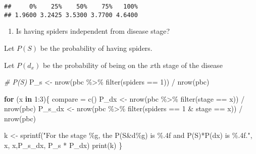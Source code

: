 \documentclass[
]{article}
\newenvironment{Shaded}{\begin{snugshade}}{\end{snugshade}}
\newcommand{\CommentTok}[1]{\textcolor[rgb]{0.56,0.35,0.01}{\textit{#1}}}
\newcommand{\ControlFlowTok}[1]{\textcolor[rgb]{0.13,0.29,0.53}{\textbf{#1}}}
\newcommand{\DecValTok}[1]{\textcolor[rgb]{0.00,0.00,0.81}{#1}}
\newcommand{\FunctionTok}[1]{\textcolor[rgb]{0.00,0.00,0.00}{#1}}
\newcommand{\NormalTok}[1]{#1}
\newcommand{\OtherTok}[1]{\textcolor[rgb]{0.56,0.35,0.01}{#1}}
\newcommand{\SpecialCharTok}[1]{\textcolor[rgb]{0.00,0.00,0.00}{#1}}
\newcommand{\StringTok}[1]{\textcolor[rgb]{0.31,0.60,0.02}{#1}}
\providecommand{\tightlist}{%
  \setlength{\itemsep}{0pt}\setlength{\parskip}{0pt}}
\begin{document}
\begin{Shaded}
\end{Shaded}

\begin{verbatim}
##     0%    25%    50%    75%   100% 
## 1.9600 3.2425 3.5300 3.7700 4.6400
\end{verbatim}

\begin{enumerate}
\def\labelenumi{\alph{enumi})}
\setcounter{enumi}{9}
\tightlist
\item
  Is having spiders independent from disease stage?
\end{enumerate}

Let \(P(S)\) be the probability of having spiders.

Let \(P(d_x)\) be the probability of being on the \(x\)th stage of the
disease

\begin{Shaded}
\begin{Highlighting}[]
\CommentTok{\# P(S)}
\NormalTok{P\_s }\OtherTok{\textless{}{-}} \FunctionTok{nrow}\NormalTok{(pbc }\SpecialCharTok{\%\textgreater{}\%}
       \FunctionTok{filter}\NormalTok{(spiders }\SpecialCharTok{==} \DecValTok{1}\NormalTok{)) }\SpecialCharTok{/} 
  \FunctionTok{nrow}\NormalTok{(pbc)}

\ControlFlowTok{for}\NormalTok{ (x }\ControlFlowTok{in} \DecValTok{1}\SpecialCharTok{:}\DecValTok{3}\NormalTok{)\{}
\NormalTok{  compare }\OtherTok{=} \FunctionTok{c}\NormalTok{()}
\NormalTok{  P\_dx }\OtherTok{\textless{}{-}} \FunctionTok{nrow}\NormalTok{(pbc }\SpecialCharTok{\%\textgreater{}\%}
                 \FunctionTok{filter}\NormalTok{(stage }\SpecialCharTok{==}\NormalTok{ x)) }\SpecialCharTok{/}
    \FunctionTok{nrow}\NormalTok{(pbc)}
\NormalTok{  P\_s\_dx }\OtherTok{\textless{}{-}} \FunctionTok{nrow}\NormalTok{(pbc }\SpecialCharTok{\%\textgreater{}\%}
                   \FunctionTok{filter}\NormalTok{(spiders }\SpecialCharTok{==} \DecValTok{1} \SpecialCharTok{\&} 
\NormalTok{                            stage }\SpecialCharTok{==}\NormalTok{ x)) }\SpecialCharTok{/}
    \FunctionTok{nrow}\NormalTok{(pbc)}
  
\NormalTok{  k }\OtherTok{\textless{}{-}} \FunctionTok{sprintf}\NormalTok{(}\StringTok{"For the stage \%g, the P(S\&d\%g) is \%.4f and P(S)*P(dx) is \%.4f."}\NormalTok{, x, x,P\_s\_dx, P\_s }\SpecialCharTok{*}\NormalTok{ P\_dx)}
  \FunctionTok{print}\NormalTok{(k)}
\NormalTok{\}}
\end{Highlighting}
\end{Shaded}
\end{document}
